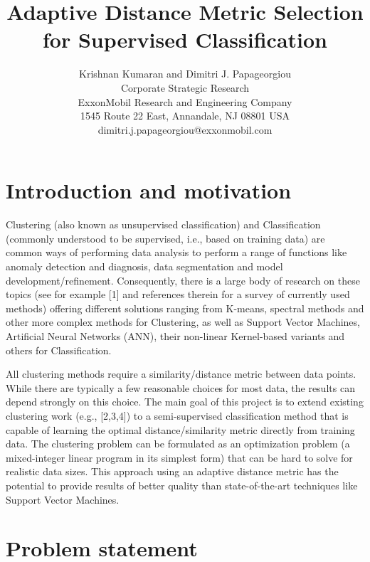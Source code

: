 \documentclass[]{article}
\title{Adaptive Distance Metric Selection for Supervised Classification}
\author{Krishnan Kumaran and Dimitri J. Papageorgiou \\
{\small Corporate Strategic Research}\\
{\small ExxonMobil Research and Engineering Company}\\
{\small 1545 Route 22 East, Annandale, NJ 08801 USA}\\
{\small dimitri.j.papageorgiou@exxonmobil.com} \\
}
\begin{document}
\maketitle

\section{Introduction and motivation}

Clustering (also known as unsupervised classification) and Classification (commonly understood to be supervised, i.e., based on training data) are common ways of performing data analysis to perform a range of functions like anomaly detection and diagnosis, data segmentation and model development/refinement. Consequently, there is a large body of research on these topics (see for example [1] and references therein for a survey of currently used methods) offering different solutions ranging from K-means, spectral methods and other more complex methods for Clustering, as well as Support Vector Machines, Artificial Neural Networks (ANN), their non-linear Kernel-based variants and others for Classification.

All clustering methods require a similarity/distance metric between data points. While there are typically a few reasonable choices for most data, the results can depend strongly on this choice. The main goal of this project is to extend existing clustering work (e.g., [2,3,4]) to a semi-supervised classification method that is capable of learning the optimal distance/similarity metric directly from training data. The clustering problem can be formulated as an optimization problem (a mixed-integer linear program in its simplest form) that can be hard to solve for realistic data sizes. This approach using an adaptive distance metric has the potential to provide results of better quality than state-of-the-art techniques like Support Vector Machines.  


\section{Problem statement}
\end{document}
